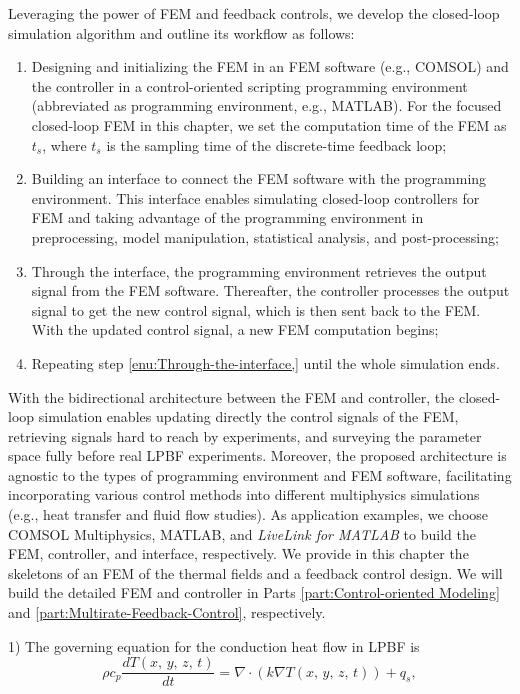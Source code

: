 \documentclass [11pt, proquest] {uwthesis}[2020/02/24]
\begin{document}
Leveraging the power of FEM and feedback controls, we develop the
closed-loop simulation algorithm and outline its workflow as follows:
\begin{enumerate}
\item Designing and initializing the FEM in an FEM software (e.g., COMSOL) and the controller in a control-oriented scripting programming environment (abbreviated as programming 
environment, e.g., MATLAB). For the focused closed-loop FEM in this chapter, we set the computation time of the FEM as $t_{s}$, where $t_{s}$ is the sampling time of the discrete-time feedback loop;
\item Building an interface to connect the FEM software with the programming
environment. This interface enables simulating closed-loop controllers
for FEM and taking advantage of the programming environment in preprocessing,
model manipulation, statistical analysis, and post-processing; 
\item \label{enu:Through-the-interface,}Through the interface, the programming
environment retrieves the output signal from the FEM software. Thereafter,
the controller processes the output signal to get the new control
signal, which is then sent back to the FEM. With the updated control
signal, a new FEM computation begins;
\item Repeating step \ref{enu:Through-the-interface,} until the whole simulation
ends.
\end{enumerate}
With the bidirectional architecture between the FEM and controller,
the closed-loop simulation enables updating directly the control signals
of the FEM, retrieving signals hard to reach by experiments, and surveying
the parameter space fully before real LPBF experiments. Moreover, the
proposed architecture is agnostic to the types of programming environment
and FEM software, facilitating incorporating various control methods
into different multiphysics simulations (e.g., heat transfer and fluid
flow studies). As application examples, we choose COMSOL Multiphysics,
MATLAB, and \emph{LiveLink for MATLAB} to build the FEM, controller,
and interface, respectively. We provide in this chapter the skeletons
of an FEM of the thermal fields and a feedback control design. We
will build the detailed FEM and controller in Parts \ref{part:Control-oriented Modeling}
and \ref{part:Multirate-Feedback-Control}, respectively.

1) The governing equation for the conduction heat flow in LPBF is
\begin{equation}
\rho c_{p}\frac{dT(x,\,y,\,z,\,t)}{dt}=\nabla\cdot(k\nabla T(x,\,y,\,z,\,t))+q_{s},\label{eq:heat_conduction}
\end{equation}
\end{document}

